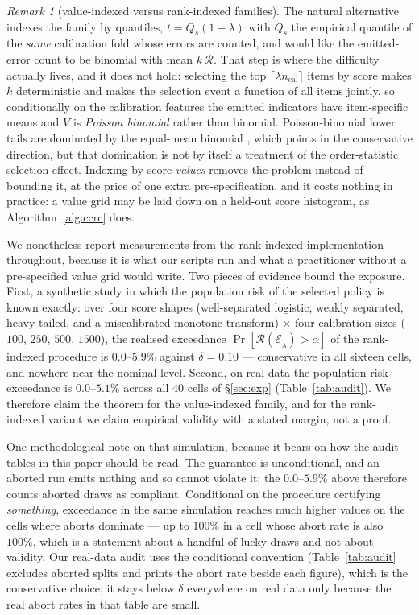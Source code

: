 \documentclass{article}
\theoremstyle{plain}
\theoremstyle{definition}
\theoremstyle{remark}
\newtheorem{remark}{Remark}
\newcommand{\Risk}{\mathcal{R}}
\newcommand{\emit}{\mathcal{E}}
\begin{document}
\begin{remark}[value-indexed versus rank-indexed families]
\label{rem:rankvsvalue}
The natural alternative indexes the family by quantiles, $t=Q_s(1-\lambda)$ with
$Q_s$ the empirical quantile of the \emph{same} calibration fold whose errors are counted, and
would like the emitted-error count to be binomial with mean $k\,\Risk$. That step is where the
difficulty actually lives, and it does not hold: selecting the top
$\lceil\lambda n_{\mathrm{cal}}\rceil$ items by score makes $k$ deterministic and makes the
selection event a function of all items jointly, so conditionally on the calibration features
the emitted indicators have item-specific means and $V$ is \emph{Poisson binomial} rather than
binomial. Poisson-binomial lower tails are dominated by the equal-mean binomial
\citep{hoeffding1956}, which points in the conservative direction, but that domination is not
by itself a treatment of the order-statistic selection effect. Indexing by score \emph{values}
removes the problem instead of bounding it, at the price of one extra pre-specification, and
it costs nothing in practice: a value grid may be laid down on a held-out score histogram, as
Algorithm~\ref{alg:ccrc} does.

We nonetheless report measurements from the rank-indexed implementation throughout, because it
is what our scripts run and what a practitioner without a pre-specified value grid would write.
Two pieces of evidence bound the exposure. First, a synthetic study in which the population risk
of the selected policy is known exactly: over four score shapes (well-separated logistic, weakly
separated, heavy-tailed, and a miscalibrated monotone transform) $\times$ four calibration sizes
($100$, $250$, $500$, $1500$), the realised exceedance $\Pr[\Risk(\emit_{\hat\lambda})>\alpha]$
of the rank-indexed procedure is $0.0$--$5.9\%$ against $\delta=0.10$ --- conservative in all
sixteen cells, and nowhere near the nominal level. Second, on real data the population-risk
exceedance is $0.0$--$5.1\%$ across all $40$ cells of \S\ref{sec:exp}
(Table~\ref{tab:audit}). We therefore claim the theorem for the value-indexed family, and for
the rank-indexed variant we claim empirical validity with a stated margin, not a proof.

One methodological note on that simulation, because it bears on how the audit tables in this
paper should be read. The guarantee is unconditional, and an aborted run emits nothing and so
cannot violate it; the $0.0$--$5.9\%$ above therefore counts aborted draws as compliant.
Conditional on the procedure certifying \emph{something}, exceedance in the same simulation
reaches much higher values on the cells where aborts dominate --- up to $100\%$ in a cell whose
abort rate is also $100\%$, which is a statement about a handful of lucky draws and not about
validity. Our real-data audit uses the conditional convention (Table~\ref{tab:audit} excludes
aborted splits and prints the abort rate beside each figure), which is the conservative choice;
it stays below $\delta$ everywhere on real data only because the real abort rates in that table
are small.
\end{remark}
\end{document}
